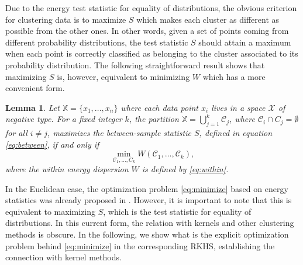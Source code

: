 \documentclass[twoside]{article}
\newtheorem{lemma}[theorem]{Lemma}
\newcommand\C{{\mathcal{C}}}
\begin{document}
Due to the energy test statistic for equality of distributions,
the obvious
criterion for clustering data is to 
maximize $S$ which makes 
each cluster as different
as possible from the other ones.
In other words, given a set of points coming from different probability
distributions, the test statistic $S$ should attain a maximum when 
each point is correctly
classified as belonging to the cluster associated to its probability
distribution.
The following 
straightforward result
shows that maximizing $S$ is, however, equivalent to minimizing
$W$ which has a more convenient form.

\begin{lemma}
\label{th:minimize}
Let $\mathbb{X} = \{x_1,\dotsc,x_n\}$ where each data point
$x_i$ lives in a space $\mathcal{X}$ of negative type. 
For a fixed integer $k$,
the partition
$\mathbb{X} = \bigcup_{j=1}^k \C_j$, where $\C_i \cap C_j = \emptyset$ for
all $i\ne j$, maximizes the between-sample statistic $S$, defined
in equation \eqref{eq:between}, if and only if
\begin{equation}
\label{eq:minimize}
\min_{\C_1,\dotsc,C_k  } W(
\C_1, \dotsc, \C_k),
\end{equation}
where the within energy dispersion $W$ is defined by \eqref{eq:within}.
\end{lemma}

In the Euclidean case, the optimization problem \eqref{eq:minimize} based on
energy statistics was already proposed in \citep{Kgroups}. However, it is
important to note that this is equivalent to maximizing $S$,
which is the test statistic for equality of distributions. In this current
form, the relation with kernels and other clustering methods is obscure.
In the following, we show what is the explicit optimization problem behind 
\eqref{eq:minimize} in the corresponding RKHS, 
establishing the connection with kernel methods.
\end{document}
